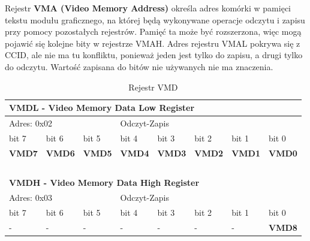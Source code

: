 Rejestr \textbf{VMA (Video Memory Address)} określa adres komórki w pamięci tekstu modułu graficznego, na której będą wykonywane operacje odczytu i zapisu przy pomocy pozostałych rejestrów. Pamięć ta może być rozszerzona, więc mogą pojawić się kolejne bity w rejestrze VMAH. Adres rejestru VMAL pokrywa się z CCID, ale nie ma tu konfliktu, ponieważ jeden jest tylko do zapisu, a drugi tylko do odczytu. Wartość zapisana do bitów nie używanych nie ma znaczenia.

\begin{table}[h]
	\begin{center}
		{\footnotesize
		\begin{tabular}{|l|l|l|l|l|l|l|l|}
			\hline
			\multicolumn{8}{|l|}{ \textbf{VMDL - Video Memory Data Low Register} } \\
			\hline
			\multicolumn{3}{|l}{ Adres: 0x02 } & \multicolumn{5}{l|}{ Odczyt-Zapis } \\
			\hline
			\hline bit 7 & bit 6 & bit 5 & bit 4 & bit 3 & bit 2 & bit 1 & bit 0 \\				
			\hline \textbf{VMD7} & \textbf{VMD6} & \textbf{VMD5} & \textbf{VMD4} & \textbf{VMD3} & \textbf{VMD2} & \textbf{VMD1} & \textbf{VMD0} \\				
			\hline \multicolumn{8}{l}{ ~ } \\
			
			\hline
			\multicolumn{8}{|l|}{ \textbf{VMDH - Video Memory Data High Register} } \\
			\hline
			\multicolumn{3}{|l}{ Adres: 0x03 } & \multicolumn{5}{l|}{ Odczyt-Zapis } \\
			\hline
			\hline bit 7 & bit 6 & bit 5 & bit 4 & bit 3 & bit 2 & bit 1 & bit 0 \\				
			\hline - & - & - & - & - & - & - & \textbf{VMD8} \\				
			\hline
		\end{tabular}}
		\caption{ Rejestr VMD }
		\label{tab:videoVMD}
	\end{center}
\end{table}



